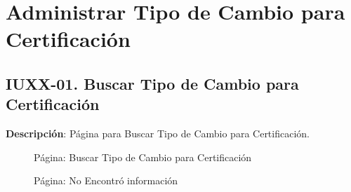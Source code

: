 \begin{table}[H]
	\caption{Forma: Eliminar Tipo de Cambio para Facturación}
	\label{tab:ui-delete-tipocambiofacturacion-form}
\end{table}



\clearpage
\section{Administrar Tipo de Cambio para Certificación} \label{sec:cf-ui-admin-tipocambiocertificacion}

\subsection{IUXX-01. Buscar Tipo de Cambio para Certificación} \label{sec:ui-page-search-tipocambiocertificacion}

\textbf{Descripción}: Página para Buscar Tipo de Cambio para Certificación.\\

\begin{figure}[H]
	\label{tab:ui-search-tipocambiocertificacion-page}
	\caption{Página: Buscar Tipo de Cambio para Certificación}
\end{figure}

\begin{figure}[H]
	\label{tab:ui-nosearch-tipocambiocertificacion-page}
	\caption{Página: No Encontró información}
\end{figure}


